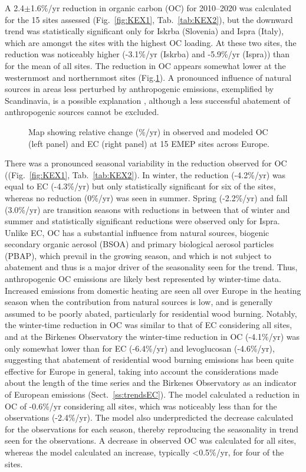 A 2.4$\pm$1.6\%/yr reduction
 in organic carbon (OC) for 2010--2020
was calculated for the 15 sites assessed (Fig.~\ref{fig:KEX1}, Tab.~\ref{tab:KEX2}), but the
downward trend was statistically significant only for Iskrba (Slovenia)
and Ispra (Italy), which are amongst the sites with the highest OC
loading. At these two sites, the reduction was noticeably higher 
(-3.1\%/yr (Iskrba) and -5.9\%/yr (Ispra)) than for the mean of all sites. The
reduction in OC appears somewhat lower at the westernmost and northernmost
sites (Fig.\ref{fig:KEX2}). A pronounced influence of natural sources in areas
less perturbed by anthropogenic emissions, exemplified by Scandinavia,
is a possible explanation \citep{Bergstrom2012,Yttri2021}, although a
less successful abatement of anthropogenic sources cannot be excluded.

\begin{figure}

\caption{Map showing relative change (\%/yr) in observed and modeled OC (left
  panel) and EC (right panel) at 15 EMEP sites across Europe. \label{fig:KEX2}}
\end{figure}

There was a pronounced seasonal variability in the reduction observed for
OC ((Fig.~\ref{fig:KEX1}, Tab.~\ref{tab:KEX2}). In winter, the
 reduction (-4.2\%/yr) was equal to
EC (-4.3\%/yr) but only statistically significant for six of the sites,
whereas no reduction (0\%/yr) was seen in summer. Spring (-2.2\%/yr)
and fall (3.0\%/yr) are transition seasons with reductions in between
that of winter and summer and statistically significant reductions were
observed only for Ispra. Unlike EC, OC has a substantial influence from
natural sources, biogenic secondary organic aerosol (BSOA) and primary
biological aerosol particles (PBAP), which prevail in the growing season,
and which is not subject to abatement and thus is a major driver of
the seasonality seen for the trend. Thus, anthropogenic OC emissions
are likely best represented by winter-time data. Increased emissions
from domestic heating are seen all over Europe in the heating season
\citep[e.g.][]{Yttri2019} when the contribution from natural sources
is low, and is generally assumed to be poorly abated, particularly
for residential wood burning. Notably, the winter-time reduction in OC
was similar to that of EC considering all sites, and at the Birkenes
Observatory the winter-time reduction in OC (-4.1\%/yr) was only somewhat
lower than for EC (-6.4\%/yr) and levoglucosan (-4.6\%/yr), suggesting
that abatement of residential wood burning emissions has been quite
effective for Europe in general, taking into account the considerations
made about the length of the time series and the Birkenes Observatory as
an indicator of European emissions (Sect.~\ref{ss:trendsEC}).  The model calculated a
reduction in OC of -0.6\%/yr considering all sites, which was noticeably
less than for the observations (-2.4\%/yr). The model also underpredicted
the decrease calculated for the observations for each season, thereby
reproducing the seasonality in trend seen for the observations. A decrease
in observed OC was calculated for all sites, whereas the model calculated
an increase, typically <0.5\%/yr, for four of the sites.

